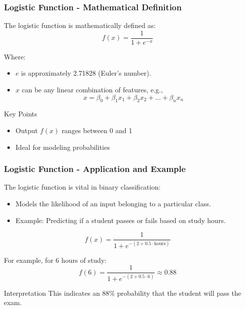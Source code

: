 \documentclass[aspectratio=169]{beamer}
\begin{document}
\begin{frame}[fragile]
    \frametitle{Logistic Function - Mathematical Definition}
    The logistic function is mathematically defined as:
    \begin{equation}
        f(x) = \frac{1}{1 + e^{-x}}
    \end{equation}

    Where:
    \begin{itemize}
        \item \( e \) is approximately 2.71828 (Euler's number).
        \item \( x \) can be any linear combination of features, e.g., 
        \[
        x = \beta_0 + \beta_1 x_1 + \beta_2 x_2 + ... + \beta_n x_n
        \]
    \end{itemize}
    
    \begin{block}{Key Points}
        \begin{itemize}
            \item Output \( f(x) \) ranges between 0 and 1
            \item Ideal for modeling probabilities
        \end{itemize}
    \end{block}
\end{frame}

\begin{frame}[fragile]
    \frametitle{Logistic Function - Application and Example}
    The logistic function is vital in binary classification:
    \begin{itemize}
        \item Models the likelihood of an input belonging to a particular class.
        \item Example: Predicting if a student passes or fails based on study hours.
    \end{itemize}

    \begin{equation}
        f(x) = \frac{1}{1 + e^{-(2 + 0.5 \cdot \text{hours})}}
    \end{equation}

    For example, for 6 hours of study:
    \begin{equation}
        f(6) = \frac{1}{1 + e^{-(2 + 0.5 \cdot 6)}} \approx 0.88
    \end{equation}
    \begin{block}{Interpretation}
        This indicates an 88\% probability that the student will pass the exam.
    \end{block}
\end{frame}
\end{document}
